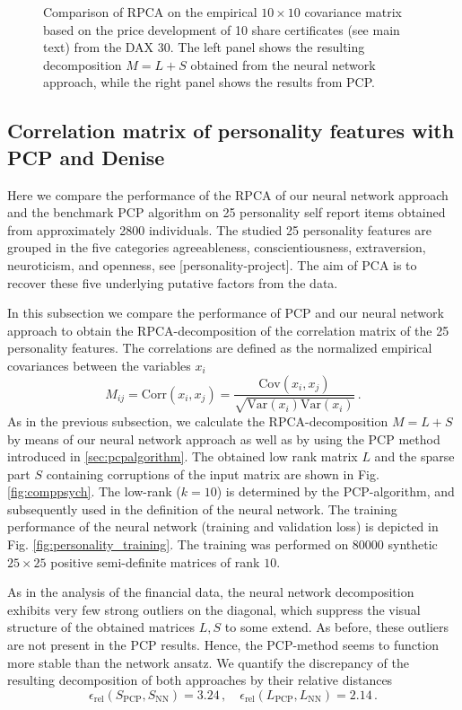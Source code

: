\begin{figure}
	\caption{Comparison of RPCA on the empirical $10\times 10$ covariance matrix based on the price development of 10 share certificates (see main text) from the DAX 30. The left panel shows the resulting decomposition $M=L+S$ obtained from the neural network approach, while the right panel shows the results from PCP.}
	\label{fig:compfinance}
\end{figure}


\subsection{Correlation matrix of personality features with PCP and Denise}
Here we compare the performance of the RPCA of our neural network approach and the benchmark PCP algorithm on 25 personality self report items obtained from approximately 2800 individuals. The studied 25 personality features are grouped in the five categories agreeableness, conscientiousness, extraversion, neuroticism, and openness, see \href{https://www.personality-project.org/r/html/bfi.html}[personality-project]. The aim of PCA is to recover these five underlying putative factors from the data.

In this subsection we compare the performance of PCP and our neural network approach to obtain the RPCA-decomposition of the correlation matrix of the 25 personality features. The correlations are defined as the normalized empirical covariances between the variables $x_i$
\[
M_{ij} = \text{Corr}(x_i,x_j) = \frac{\text{Cov}(x_i,x_j)}{\sqrt{\text{Var}(x_i) \text{Var}(x_i)}} \,.
\]
As in the previous subsection, we calculate the RPCA-decomposition $M=L + S$ by means of our neural network approach as well as by using the PCP method introduced in \ref{sec:pcpalgorithm}. The obtained low rank matrix $L$ and the sparse part $S$ containing corruptions of the input matrix are shown in Fig. \ref{fig:comppsych}. The low-rank ($k=10$) is determined by the PCP-algorithm, and subsequently used in the definition of the neural network. The training performance of the neural network (training and validation loss) is depicted in Fig. \ref{fig:personality_training}. The training was performed on 80000 synthetic $25\times 25$ positive semi-definite matrices of rank $10$.

As in the analysis of the financial data, the neural network decomposition exhibits very few strong outliers on the diagonal, which suppress the visual structure of the obtained matrices $L,S$ to some extend. As before, these outliers are not present in the PCP results. Hence, the PCP-method seems to function more stable than the network ansatz. We quantify the discrepancy of the resulting decomposition of both approaches by their relative distances
\begin{equation}
\epsilon_\text{rel}(S_\text{PCP},S_\text{NN}) = 3.24 \,, \quad  \epsilon_\text{rel}(L_\text{PCP},L_\text{NN}) = 2.14 \,.
\end{equation}

